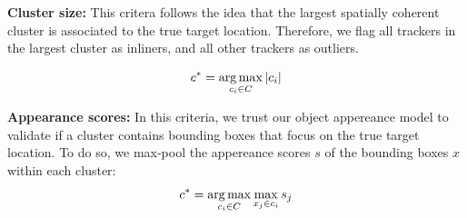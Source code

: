 \textbf{Cluster size:}
This critera follows the idea that the largest spatially coherent cluster
is associated to the true target location. Therefore, we flag all trackers
in the largest cluster as inliners, and all other trackers as outliers.

\begin{equation}
 c^{*} = \operatorname*{arg\,max}_{c_i\in C} |c_i|
\end{equation}


\textbf{Appearance scores:}
In this criteria, we trust our object appereance model to validate if a cluster
contains bounding boxes that focus on the true target location.
To do so, we max-pool the appereance scores $s$ of the bounding boxes $x$ within
each cluster:
\begin{equation}
 c^{*} = \operatorname*{arg\,max}_{c_i\in C} \max_{x_j \in c_i} s_{j}
\end{equation}

